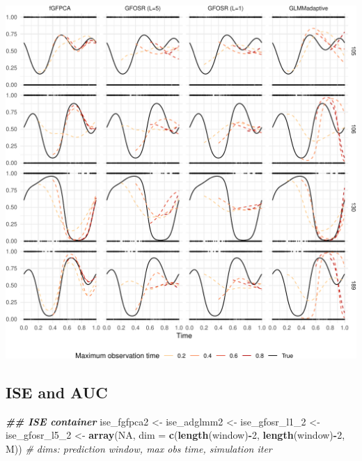 \documentclass[
]{article}
\newenvironment{Shaded}{\begin{snugshade}}{\end{snugshade}}
\newcommand{\AttributeTok}[1]{\textcolor[rgb]{0.13,0.29,0.53}{#1}}
\newcommand{\CommentTok}[1]{\textcolor[rgb]{0.56,0.35,0.01}{\textit{#1}}}
\newcommand{\ConstantTok}[1]{\textcolor[rgb]{0.56,0.35,0.01}{#1}}
\newcommand{\DecValTok}[1]{\textcolor[rgb]{0.00,0.00,0.81}{#1}}
\newcommand{\DocumentationTok}[1]{\textcolor[rgb]{0.56,0.35,0.01}{\textbf{\textit{#1}}}}
\newcommand{\FunctionTok}[1]{\textcolor[rgb]{0.13,0.29,0.53}{\textbf{#1}}}
\newcommand{\NormalTok}[1]{#1}
\newcommand{\OtherTok}[1]{\textcolor[rgb]{0.56,0.35,0.01}{#1}}
\newcommand{\SpecialCharTok}[1]{\textcolor[rgb]{0.81,0.36,0.00}{\textbf{#1}}}
\begin{document}
\includegraphics{manuscript_files/figure-latex/fig_small_sim-1.pdf}

\hypertarget{ise-and-auc-1}{%
\subsection{ISE and AUC}\label{ise-and-auc-1}}

\begin{Shaded}
\begin{Highlighting}[]
\DocumentationTok{\#\# ISE container }
\NormalTok{ise\_fgfpca2 }\OtherTok{\textless{}{-}}\NormalTok{ ise\_adglmm2 }\OtherTok{\textless{}{-}}\NormalTok{ ise\_gfosr\_l1\_2 }\OtherTok{\textless{}{-}}\NormalTok{ ise\_gfosr\_l5\_2 }\OtherTok{\textless{}{-}} 
  \FunctionTok{array}\NormalTok{(}\ConstantTok{NA}\NormalTok{, }\AttributeTok{dim =} \FunctionTok{c}\NormalTok{(}\FunctionTok{length}\NormalTok{(window)}\SpecialCharTok{{-}}\DecValTok{2}\NormalTok{, }\FunctionTok{length}\NormalTok{(window)}\SpecialCharTok{{-}}\DecValTok{2}\NormalTok{, M))}
\CommentTok{\# dims: prediction window, max obs time, simulation iter}
\end{Highlighting}
\end{Shaded}
\end{document}
